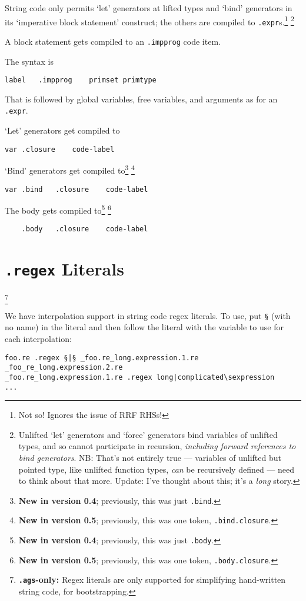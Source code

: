 \documentclass{report}
\newcommand\stringcode[1]{\texttt{#1}}
\newcommand\agsonly[1]{\footnote{\textbf{\texttt{.ags}-only: }#1}}
\newcommand\new[2]{\footnote{\textbf{New in version #1}; previously, #2}}
\begin{document}
String code only permits `let' generators at lifted types and `bind' generators in its `imperative block statement' construct;
the others are compiled to \verb+.expr+s.\footnote{Not so!  Ignores the issue of RRF RHSs!}
\footnote{
    Unlifted `let' generators and `force' generators bind variables of unlifted types,
    and so cannot participate in recursion,
    \emph{including forward references to bind generators}.
    NB: That's not entirely true --- variables of unlifted but pointed type, like unlifted function types,
    \emph{can} be recursively defined --- need to think about that more.
    Update: I've thought about this; it's a \emph{long} story.
}

A block statement gets compiled to an \verb+.impprog+ code item.

The syntax is
\begin{verbatim}
label	.impprog	primset	primtype
\end{verbatim}
That is followed by global variables, free variables, and arguments as for an \verb+.expr+.

`Let' generators get compiled to
\begin{verbatim}
var	.closure	code-label
\end{verbatim}
`Bind' generators get compiled to\new{0.4}{this was just \stringcode{.bind}.} \new{0.5}{this was one token, \stringcode{.bind.closure}.}
\begin{verbatim}
var	.bind	.closure	code-label
\end{verbatim}
The body gets compiled to\new{0.4}{this was just \stringcode{.body}.} \new{0.5}{this was one token, \stringcode{.body.closure}.}
\begin{verbatim}
	.body	.closure	code-label
\end{verbatim}

\chapter{\stringcode{.regex} Literals}\agsonly{Regex literals are only supported for simplifying hand-written string code, for bootstrapping.}

We have interpolation support in string code regex literals.
To use, put \stringcode{§} (with no name) in the literal
and then follow the literal with the variable to use for each interpolation:
\begin{verbatim}
foo.re .regex §|§ _foo.re_long.expression.1.re _foo_re_long.expression.2.re
_foo.re_long.expression.1.re .regex long|complicated\sexpression
...
\end{verbatim}
\end{document}
